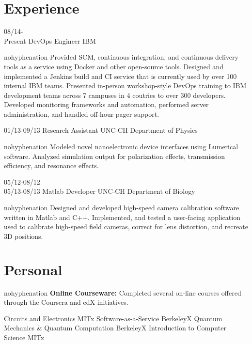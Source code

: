 \documentclass[]{fancy-resume}
\begin{document}
\section{Experience}
\begin{entrylist}
  \entry
    {08/14-\\Present}
    {DevOps Engineer}
    {IBM}
    {\begin{hyphenrules}{nohyphenation} Provided SCM, continuous integration, and continuous delivery tools as a service using Docker and other open-source tools. Designed and implemented a Jenkins build and CI service that is currently used by over 100 internal IBM teams. Presented in-person workshop-style DevOps training to IBM development teams across 7 campuses in 4 coutries to over 300 developers.  Developed monitoring frameworks and automation, performed server administration, and handled off-hour pager support.\\
    \end{hyphenrules}}
    \vspace{10pt}
    \entry
    {01/13-09/13}
    {Research Assistant}
    {UNC-CH Department of Physics}
    {\begin{hyphenrules}{nohyphenation} Modeled novel nanoelectronic device interfaces using Lumerical software. Analyzed simulation output for polarization effects, transmission efficiency, and resonance effects.
    \end{hyphenrules}}
    \entry
    {05/12-08/12\\05/13-08/13}
    {Matlab Developer}
    {UNC-CH Department of Biology}
    {\begin{hyphenrules}{nohyphenation} Designed and developed high-speed camera calibration software written in Matlab and C++. Implemented, and tested a user-facing application used to calibrate high-speed field cameras, correct for lens distortion, and recreate 3D positions.
    \end{hyphenrules}}
\end{entrylist}

\section{Personal}
{\begin{hyphenrules}{nohyphenation} \textbf{Online Courseware:} Completed several on-line courses offered through the Coursera and edX initiatives. 
\end{hyphenrules}}

\begin{entrylist}
   {Circuits and Electronics} {MITx}
   {Software-as-a-Service} {BerkeleyX}
   {Quantum Mechanics \& Quantum Computation} {BerkeleyX}
   {Introduction to Computer Science} {MITx}
\end{entrylist}
\end{document}
